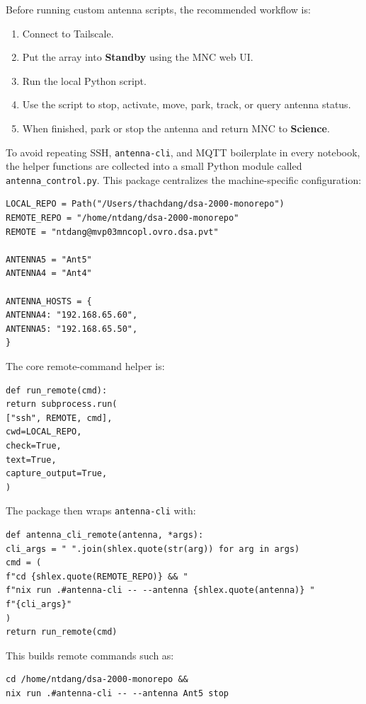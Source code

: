 \documentclass[12pt]{extarticle}
\begin{document}
Before running custom antenna scripts, the recommended workflow is:

\begin{enumerate}
\item Connect to Tailscale.
\item Put the array into \textbf{Standby} using the MNC web UI.
\item Run the local Python script.
\item Use the script to stop, activate, move, park, track, or query antenna status.
\item When finished, park or stop the antenna and return MNC to \textbf{Science}.
\end{enumerate}

To avoid repeating SSH, \texttt{antenna-cli}, and MQTT boilerplate in every
notebook, the helper functions are collected into a small Python module called
\texttt{antenna\_control.py}. This package centralizes the machine-specific
configuration:

\begin{lstlisting}
LOCAL_REPO = Path("/Users/thachdang/dsa-2000-monorepo")
REMOTE_REPO = "/home/ntdang/dsa-2000-monorepo"
REMOTE = "ntdang@mvp03mncopl.ovro.dsa.pvt"

ANTENNA5 = "Ant5"
ANTENNA4 = "Ant4"

ANTENNA_HOSTS = {
ANTENNA4: "192.168.65.60",
ANTENNA5: "192.168.65.50",
}
\end{lstlisting}

The core remote-command helper is:

\begin{lstlisting}
def run_remote(cmd):
return subprocess.run(
["ssh", REMOTE, cmd],
cwd=LOCAL_REPO,
check=True,
text=True,
capture_output=True,
)
\end{lstlisting}

The package then wraps \texttt{antenna-cli} with:

\begin{lstlisting}
def antenna_cli_remote(antenna, *args):
cli_args = " ".join(shlex.quote(str(arg)) for arg in args)
cmd = (
f"cd {shlex.quote(REMOTE_REPO)} && "
f"nix run .#antenna-cli -- --antenna {shlex.quote(antenna)} "
f"{cli_args}"
)
return run_remote(cmd)
\end{lstlisting}

This builds remote commands such as:

\begin{lstlisting}
cd /home/ntdang/dsa-2000-monorepo &&
nix run .#antenna-cli -- --antenna Ant5 stop
\end{lstlisting}
\end{document}
